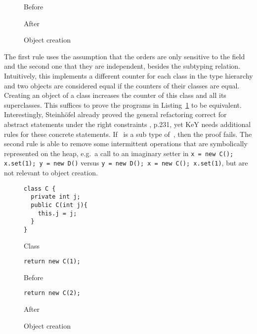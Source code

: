 \begin{figure}[tbp]
  \captionsetup{type=lstlisting}
  \centering
  \begin{sublstlisting}{.2\linewidth}
    
    \caption{Before}
  \end{sublstlisting}\hspace{1cm}
  \begin{sublstlisting}{.2\linewidth}
    
    \caption{After}
  \end{sublstlisting}
  \caption{Object creation}
  \label{lst:ObjectCreation-refinity}
\end{figure}

The first rule uses the assumption that the orders are only sensitive to the  field and the second one that they are independent, besides the subtyping relation.
Intuitively, this implements a different counter for each class in the type hierarchy and two objects are considered equal if the counters of their classes are equal.
Creating an object of a class increases the counter of this class and all its superclasses.
This suffices to prove the programs in Listing~\ref{lst:ObjectCreation-refinity} to be equivalent.
Interestingly, Steinhöfel already proved the general  refactoring correct for abstract statements under the right constraints \cite{steinhoefel-20}, p.231, yet KeY needs additional rules for these concrete statements.
If~ is a sub type of~, then the proof fails.
The second rule is able to remove some intermittent operations that are symbolically represented on the heap, e.g.\ a call to an imaginary setter in \lstinline{x = new C(); x.set(1); y = new D()} versus \lstinline{y = new D(); x = new C(); x.set(1)}, but are not relevant to object creation.

\begin{figure}[tbp]
\captionsetup{type=lstlisting}
\centering
\begin{sublstlisting}[b]{.3\linewidth}
\begin{lstlisting}[style=refinity]
class C {
  private int j;
  public C(int j){
    this.j = j;
  }
}
\end{lstlisting}
\caption{Class}
\end{sublstlisting}\hspace{3mm}
\begin{sublstlisting}[b]{.3\linewidth}
\begin{lstlisting}[style=refinity]
return new C(1);
\end{lstlisting}
\caption{Before}
\end{sublstlisting}\hspace{3mm}
\begin{sublstlisting}[b]{.3\linewidth}
\begin{lstlisting}[style=refinity]
return new C(2);
\end{lstlisting}
\caption{After}
\end{sublstlisting}
\caption{Object creation}
\label{lst:ObjectCreation-refinity-2}
\end{figure}

